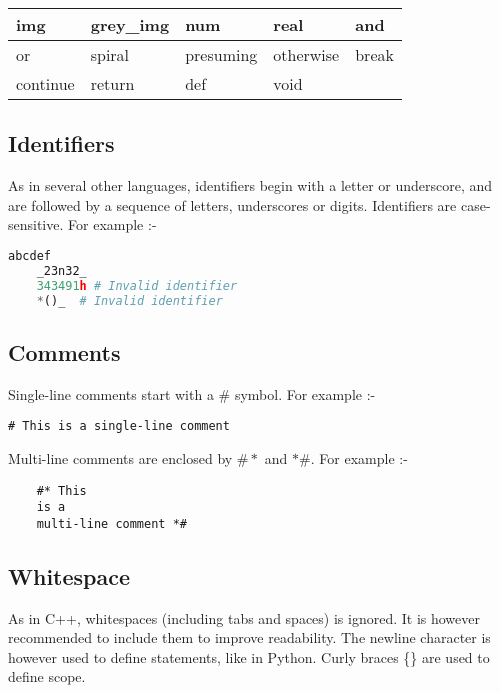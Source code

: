 \documentclass[a4paper, 11pt]{article}
\begin{document}
  \begin{tabular}{ |p{3cm}|p{3cm}|p{3cm}|p{3cm}|p{3cm}| }
    \hline
    img & grey\_img & num & real & and\\
    \hline
    or & spiral & presuming & otherwise & break \\
    \hline
    continue & return & def & void & \\
    \hline
   \end{tabular}

  \subsection{Identifiers}
  
    As in several other languages, identifiers begin with a letter or underscore, and are followed by a sequence of letters, underscores or digits. Identifiers are case-sensitive. For example :-
   \begin{lstlisting}[language=Python]
    abcdef
    _23n32_
    343491h # Invalid identifier
    *()_  # Invalid identifier\end{lstlisting}


  \subsection{Comments}

  Single-line comments start with a $\#$ symbol. For example :-

  \begin{lstlisting}[]
    # This is a single-line comment\end{lstlisting}

  Multi-line comments are enclosed by $\#*$ and $*\#$. For example :-

  \begin{lstlisting}
    #* This
    is a
    multi-line comment *#\end{lstlisting}

    \subsection{Whitespace}

    As in C++, whitespaces (including tabs and spaces) is ignored. It is however recommended to include them to improve readability. 
    The newline character is however used to define statements, like in Python. Curly braces \{\} are used to define scope. 
\end{document}

